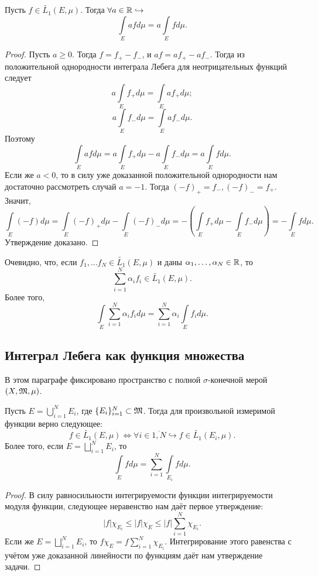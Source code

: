 \begin{proposition}
    Пусть $f \in \widetilde{L_1}(E, \mu)$. Тогда $\forall a \in \mathbb{R} \hookrightarrow$ \[\int\limits_E afd\mu = a\int\limits_E fd\mu.\]
\end{proposition}
\begin{proof}
    Пусть $a \geq 0$. Тогда $f = f_+ - f_-$, и $af = af_+ - af_-$. Тогда из положительной однородности интеграла Лебега для неотрицательных функций следует \[a\int\limits_E f_+d\mu = \int\limits_E af_+d\mu;\]
    \[a\int\limits_E f_-d\mu = \int\limits_E af_-d\mu.\]
    Поэтому \[\int\limits_E afd\mu = a\int\limits_E f_+d\mu - a\int\limits_E f_-d\mu = a\int\limits_E fd\mu.\]
    Если же $a < 0$, то в силу уже доказанной положительной однородности нам достаточно рассмотреть случай $a = -1$. Тогда $(-f)_+ = f_-, (-f)_- = f_+$. Значит, \[\int\limits_E (-f)d\mu = \int\limits_E (-f)_+d\mu - \int\limits_E (-f)_-d\mu = -(\int\limits_E f_+d\mu - \int\limits_E f_-d\mu) = -\int\limits_E fd\mu.\]
    Утверждение доказано.
\end{proof}
\begin{corollary}
    Очевидно, что, если $f_1, \ldots f_N \in \widetilde{L_1}(E, \mu)$ и даны $\alpha_1, \ldots, \alpha_N \in \mathbb{R}$, то \[\sum\limits_{i = 1}^N \alpha_if_i \in \widetilde{L_1}(E, \mu).\]
    Более того, \[\int\limits_E \sum\limits_{i = 1}^N \alpha_if_i d\mu = \sum\limits_{i = 1}^N \alpha_i \int\limits_E f_i d\mu.\]
\end{corollary}

\subsection{Интеграл Лебега как функция множества}
В этом параграфе фиксировано пространство с полной $\sigma$-конечной мерой $(X, \mathfrak{M}, \mu)$.
\begin{proposition}
    Пусть $E = \bigcup\limits_{i = 1}^N E_i$, где $\{E_i\}_{i = 1}^N \subset \mathfrak{M}$. Тогда для произвольной измеримой функции верно следующее: \[f \in \widetilde{L_1}(E, \mu) \Longleftrightarrow \forall i \in \overline{1, N} \hookrightarrow f \in \widetilde{L_1}(E_i, \mu).\]
    Более того, если $E = \bigsqcup\limits_{i = 1}^N E_i$, то \[\int\limits_{E} fd\mu = \sum\limits_{i = 1}^N \int\limits_{E_i} fd\mu.\]
\end{proposition}
\begin{proof}
    В силу равносильности интегрируемости функции интегрируемости модуля функции, следующее неравенство нам даёт первое утверждение: \[|f|\chi_{E_i} \leq |f|\chi_E \leq |f|\sum\limits_{i = 1}^N \chi_{E_i}.\]
    Если же $E = \bigsqcup_{i = 1}^N E_i$, то $f \chi_E = f \sum\limits_{i = 1}^N \chi_{E_i}$. Интегрирование этого равенства с учётом уже доказанной линейности по функциям даёт нам утверждение задачи.
\end{proof}


